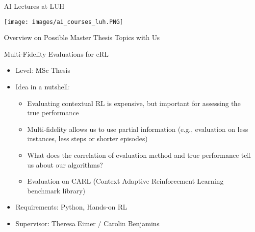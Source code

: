 \documentclass[aspectratio=169]{../latex_main/tntbeamer}  %
\begin{document}
\begin{frame}[c]{AI Lectures at LUH}
	
	\centering
	\texttt{[image: images/ai\_courses\_luh.PNG]}
	
\end{frame}
\begin{frame}[c]{}
	
	\centering
	\huge
	Overview on Possible Master Thesis Topics with Us
	
\end{frame}
\begin{frame}[c]{Multi-Fidelity Evaluations for cRL}
	
    \begin{itemize}
		\item Level: MSc Thesis
		\item Idea in a nutshell:
		\begin{itemize}
		    \item Evaluating contextual RL is expensive, but important for assessing the true performance
		    \item Multi-fidelity allows us to use partial information (e.g., evaluation on less instances, less steps or shorter episodes)
		    \item What does the correlation of evaluation method and true performance tell us about our algorithms?
		    \item Evaluation on CARL (Context Adaptive Reinforcement Learning benchmark library)
		\end{itemize}
		\item Requirements: Python, Hands-on RL
		\item Supervisor: Theresa Eimer / Carolin Benjamins
	\end{itemize}
	
\end{frame}
\end{document}
